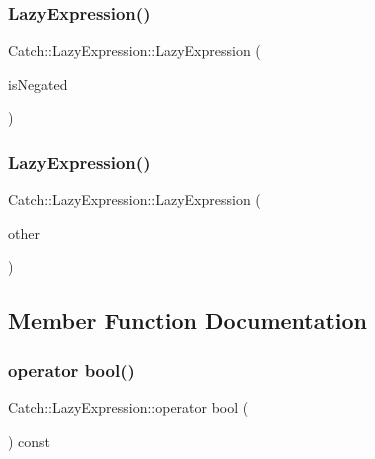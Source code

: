 \subsubsection{LazyExpression()\hspace{0.1cm}{\footnotesize\ttfamily [1/2]}}
{\footnotesize\ttfamily Catch\+::\+Lazy\+Expression\+::\+Lazy\+Expression (\begin{DoxyParamCaption}\item[{bool}]{is\+Negated }\end{DoxyParamCaption})}

\mbox{\label{class_catch_1_1_lazy_expression_ab82d5e94df0e159b018fbde0170e46f8}} 
\subsubsection{LazyExpression()\hspace{0.1cm}{\footnotesize\ttfamily [2/2]}}
{\footnotesize\ttfamily Catch\+::\+Lazy\+Expression\+::\+Lazy\+Expression (\begin{DoxyParamCaption}\item[{\textbf{ Lazy\+Expression} const \&}]{other }\end{DoxyParamCaption})}



\subsection{Member Function Documentation}
\mbox{\label{class_catch_1_1_lazy_expression_acdb846cb230cecfc6aca7a925b31fbca}} 
\subsubsection{operator bool()}
{\footnotesize\ttfamily Catch\+::\+Lazy\+Expression\+::operator bool (\begin{DoxyParamCaption}{ }\end{DoxyParamCaption}) const\hspace{0.3cm}{\ttfamily [explicit]}}

\mbox{\label{class_catch_1_1_lazy_expression_ae4ae00d4f36f084c369f2da36565a822}} 
